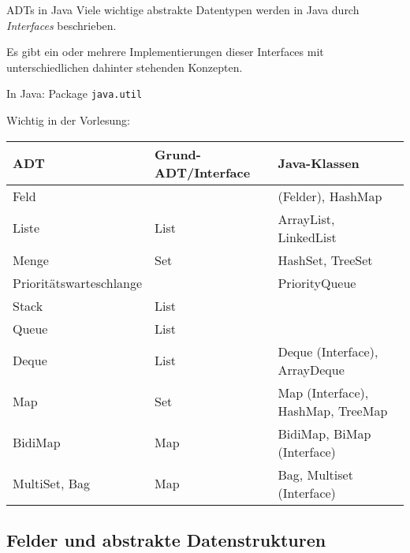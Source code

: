 \begin{bonus}{ADTs in Java}
    Viele wichtige abstrakte Datentypen werden in Java durch \emph{Interfaces} beschrieben.

    Es gibt ein oder mehrere Implementierungen dieser Interfaces mit unterschiedlichen dahinter stehenden Konzepten.

    In Java: Package \texttt{java.util}

    Wichtig in der Vorlesung:

    \begin{tabular}{l|l|l}
        ADT                     & Grund-ADT/Interface & Java-Klassen                      \\
        \hline
        Feld                    &                     & (Felder), HashMap                 \\
        Liste                   & List                & ArrayList, LinkedList             \\
        Menge                   & Set                 & HashSet, TreeSet                  \\
        Prioritätswarteschlange &                     & PriorityQueue                     \\
        Stack                   & List                &                                   \\
        Queue                   & List                &                                   \\
        Deque                   & List                & Deque (Interface), ArrayDeque     \\
        Map                     & Set                 & Map (Interface), HashMap, TreeMap \\
        BidiMap                 & Map                 & BidiMap, BiMap (Interface)        \\
        MultiSet, Bag           & Map                 & Bag, Multiset (Interface)
    \end{tabular}
\end{bonus}

\subsection{Felder und abstrakte Datenstrukturen}

